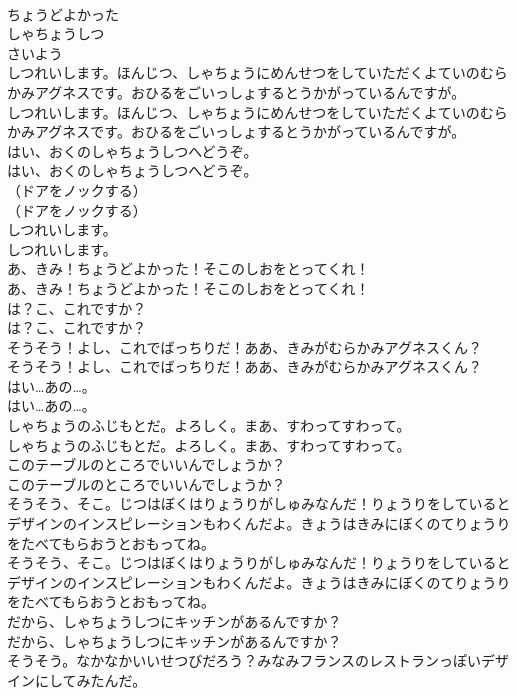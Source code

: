 \documentclass[8pt]{extreport}
\begin{document}
\begin{CJK}{UTF8}{min}
\\	ちょうどよかった
\\	しゃちょうしつ
\\	さいよう
\\	しつれいします。ほんじつ、しゃちょうにめんせつをしていただくよていのむらかみアグネスです。おひるをごいっしょするとうかがっているんですが。
\\	しつれいします。ほんじつ、しゃちょうにめんせつをしていただくよていのむらかみアグネスです。おひるをごいっしょするとうかがっているんですが。
\\	はい、おくのしゃちょうしつへどうぞ。
\\	はい、おくのしゃちょうしつへどうぞ。
\\	（ドアをノックする）
\\	（ドアをノックする）
\\	しつれいします。
\\	しつれいします。
\\	あ、きみ！ちょうどよかった！そこのしおをとってくれ！
\\	あ、きみ！ちょうどよかった！そこのしおをとってくれ！
\\	は？こ、これですか？
\\	は？こ、これですか？
\\	そうそう！よし、これでばっちりだ！ああ、きみがむらかみアグネスくん？
\\	そうそう！よし、これでばっちりだ！ああ、きみがむらかみアグネスくん？
\\	はい…あの…。
\\	はい…あの…。
\\	しゃちょうのふじもとだ。よろしく。まあ、すわってすわって。
\\	しゃちょうのふじもとだ。よろしく。まあ、すわってすわって。
\\	このテーブルのところでいいんでしょうか？
\\	このテーブルのところでいいんでしょうか？
\\	そうそう、そこ。じつはぼくはりょうりがしゅみなんだ！りょうりをしているとデザインのインスピレーションもわくんだよ。きょうはきみにぼくのてりょうりをたべてもらおうとおもってね。
\\	そうそう、そこ。じつはぼくはりょうりがしゅみなんだ！りょうりをしているとデザインのインスピレーションもわくんだよ。きょうはきみにぼくのてりょうりをたべてもらおうとおもってね。
\\	だから、しゃちょうしつにキッチンがあるんですか？
\\	だから、しゃちょうしつにキッチンがあるんですか？
\\	そうそう。なかなかいいせつびだろう？みなみフランスのレストランっぽいデザインにしてみたんだ。

\end{CJK}
\end{document}
